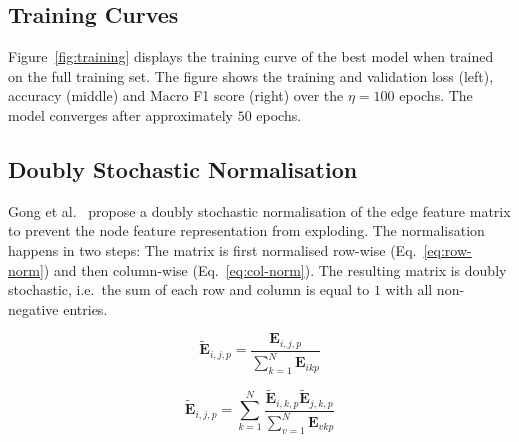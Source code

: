 \documentclass[10pt,conference,compsocconf]{ieee}
\begin{document}
\subsection{Training Curves}

Figure~\ref{fig:training} displays the training curve of the best model when
trained on the full training set. The figure shows the training and validation
loss (left), accuracy (middle) and Macro F1 score (right) over the $\eta = 100$
epochs. The model converges after approximately $50$ epochs.

\subsection{Doubly Stochastic Normalisation}

Gong et al.~\cite{egnn} propose a doubly stochastic normalisation of the edge
feature matrix to prevent the node feature representation from exploding. The
normalisation happens in two steps: The matrix is first normalised row-wise
(Eq.~\ref{eq:row-norm}) and then column-wise (Eq.~\ref{eq:col-norm}). The
resulting matrix is doubly stochastic, i.e.\ the sum of each row and column is
equal to $1$ with all non-negative entries.

\begin{equation}
   \tilde{\mathbf{E}}_{i,j,p} = 
   \frac{\mathbf{E}_{i,j,p}}{\sum_{k=1}^N \mathbf{E}_{ikp}}
   \label{eq:row-norm}
\end{equation}
 
\begin{equation}
  \tilde{\mathbf{E}}_{i,j,p} = 
  \sum_{k=1}^{N}
  \frac{\tilde{\mathbf{E}}_{i,k,p}\tilde{\mathbf{E}}_{j,k,p}}{\sum_{v=1}^N \mathbf{E}_{vkp}}
  \label{eq:col-norm}
\end{equation}
\end{document}
